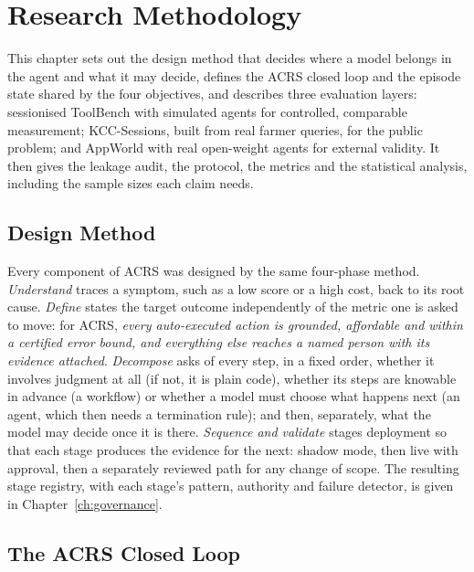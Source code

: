 \chapter{Research Methodology}
\label{ch:methodology}

\begin{chaptersummary}
This chapter sets out the design method that decides where a model belongs in the agent and what it may
decide, defines the ACRS closed loop and the episode state shared by the four objectives, and describes
three evaluation layers: sessionised ToolBench with simulated agents for controlled, comparable
measurement; KCC-Sessions, built from real farmer queries, for the public problem; and AppWorld with
real open-weight agents for external validity. It then gives the leakage audit, the protocol, the
metrics and the statistical analysis, including the sample sizes each claim needs.
\end{chaptersummary}

\section{Design Method}
\label{sec:method-design}

Every component of ACRS was designed by the same four-phase method. \emph{Understand} traces a symptom,
such as a low score or a high cost, back to its root cause. \emph{Define} states the target outcome
independently of the metric one is asked to move: for ACRS, \emph{every auto-executed action is
grounded, affordable and within a certified error bound, and everything else reaches a named person with
its evidence attached}. \emph{Decompose} asks of every step, in a fixed order, whether it involves
judgment at all (if not, it is plain code), whether its steps are knowable in advance (a workflow) or
whether a model must choose what happens next (an agent, which then needs a termination rule); and then,
separately, what the model may decide once it is there. \emph{Sequence and validate} stages deployment
so that each stage produces the evidence for the next: shadow mode, then live with approval, then a
separately reviewed path for any change of scope. The resulting stage registry, with each stage's
pattern, authority and failure detector, is given in Chapter~\ref{ch:governance}.

\section{The ACRS Closed Loop}
\label{sec:method-loop}

